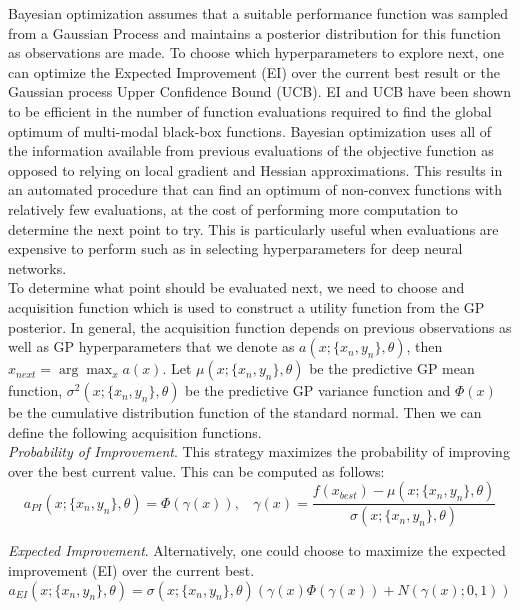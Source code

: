 Bayesian optimization assumes that a suitable performance function was sampled from a Gaussian Process and maintains a posterior distribution for this function as observations are made. To choose which hyperparameters to explore next, one can optimize the Expected Improvement (EI) over the current best result or the Gaussian process Upper Confidence Bound (UCB). EI and UCB have been shown to be efficient in the number of function evaluations required to find the global optimum of multi-modal black-box functions. Bayesian optimization uses all of the information available from previous evaluations of the objective function as opposed to relying on local gradient and Hessian approximations. This results in an automated procedure that can find an optimum of non-convex functions with relatively few evaluations, at the cost of performing more computation to determine the next point to try. This is particularly useful when evaluations are expensive to perform such as in selecting hyperparameters for deep neural networks.\\

To determine what point should be evaluated next, we need to choose and acquisition function which is used to construct a utility function from the GP posterior. In general, the acquisition function depends on previous observations as well as GP hyperparameters that we denote as $a(x;\{x_n,y_n\},\theta)$, then $x_{next} = \arg \max_x a(x)$. Let $\mu(x;\{x_n,y_n\},\theta)$ be the predictive GP mean function, $\sigma^{2}(x;\{x_n,y_n\},\theta)$ be the predictive GP variance function and $\Phi(x)$ be the cumulative distribution function of the standard normal. Then we can define the following acquisition functions.\\

\textit{Probability of Improvement}. This strategy maximizes the probability of improving over the best current value. This can be computed as follows:
\begin{equation}
    a_{PI}(x;\{x_n,y_n\},\theta) = \Phi(\gamma(x)), ~~~~ \gamma(x) = \frac{f(x_{best}) - \mu(x; \{x_n,y_n\},\theta)}{\sigma(x;\{x_n,y_n\},\theta)}
\end{equation}

\textit{Expected Improvement}. Alternatively, one could choose to maximize the expected improvement (EI) over the current best. 
\begin{equation}
    a_{EI}(x;\{x_n,y_n\},\theta) = \sigma(x;\{x_n,y_n\},\theta)(\gamma(x)\Phi(\gamma(x))+N(\gamma(x);0,1))
\end{equation}


